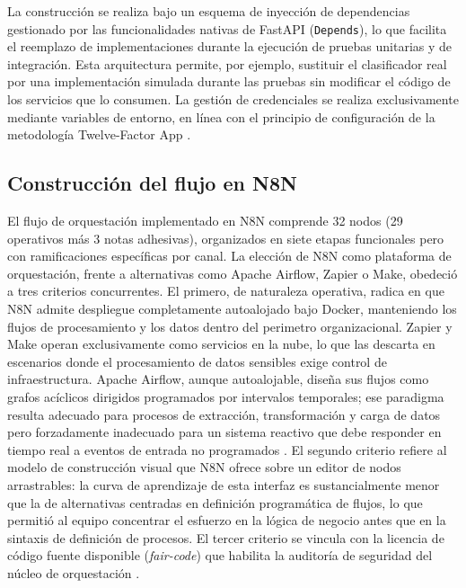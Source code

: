 La construcción se realiza bajo un esquema de inyección de dependencias gestionado por las funcionalidades nativas de FastAPI (\texttt{Depends}), lo que facilita el reemplazo de implementaciones durante la ejecución de pruebas unitarias y de integración. Esta arquitectura permite, por ejemplo, sustituir el clasificador real por una implementación simulada durante las pruebas sin modificar el código de los servicios que lo consumen. La gestión de credenciales se realiza exclusivamente mediante variables de entorno, en línea con el principio de configuración de la metodología Twelve-Factor App \parencite{Wiggins2017_12factor}.

\subsection{Construcción del flujo en N8N}\label{subsec:construccion-flujo-n8n}

El flujo de orquestación implementado en N8N comprende 32 nodos (29 operativos más 3 notas adhesivas), organizados en siete etapas funcionales pero con ramificaciones específicas por canal. La elección de N8N como plataforma de orquestación, frente a alternativas como Apache Airflow, Zapier o Make, obedeció a tres criterios concurrentes. El primero, de naturaleza operativa, radica en que N8N admite despliegue completamente autoalojado bajo Docker, manteniendo los flujos de procesamiento y los datos dentro del perimetro organizacional. Zapier y Make operan exclusivamente como servicios en la nube, lo que las descarta en escenarios donde el procesamiento de datos sensibles exige control de infraestructura. Apache Airflow, aunque autoalojable, diseña sus flujos como grafos acíclicos dirigidos programados por intervalos temporales; ese paradigma resulta adecuado para procesos de extracción, transformación y carga de datos pero forzadamente inadecuado para un sistema reactivo que debe responder en tiempo real a eventos de entrada no programados \parencite{Apache2024_airflow}. El segundo criterio refiere al modelo de construcción visual que N8N ofrece sobre un editor de nodos arrastrables: la curva de aprendizaje de esta interfaz es sustancialmente menor que la de alternativas centradas en definición programática de flujos, lo que permitió al equipo concentrar el esfuerzo en la lógica de negocio antes que en la sintaxis de definición de procesos. El tercer criterio se vincula con la licencia de código fuente disponible (\emph{fair-code}) que habilita la auditoría de seguridad del núcleo de orquestación \parencite{n8n2024_docs}.

